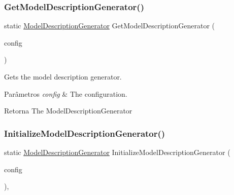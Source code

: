 \subsubsection{\texorpdfstring{Get\+Model\+Description\+Generator()}{GetModelDescriptionGenerator()}}
{\footnotesize\ttfamily static \hyperlink{classApi3Layers_1_1Areas_1_1HelpPage_1_1ModelDescriptions_1_1ModelDescriptionGenerator}{Model\+Description\+Generator} Get\+Model\+Description\+Generator (\begin{DoxyParamCaption}\item[{this Http\+Configuration}]{config }\end{DoxyParamCaption})\hspace{0.3cm}{\ttfamily [static]}}



Gets the model description generator. 


\begin{DoxyParams}{Parâmetros}
{\em config} & The configuration.\\
\hline
\end{DoxyParams}
\begin{DoxyReturn}{Retorna}
The Model\+Description\+Generator
\end{DoxyReturn}
\mbox{\label{classApi3Layers_1_1Areas_1_1HelpPage_1_1HelpPageConfigurationExtensions_a16f47e8aa323c09cd0cf32e89db952bf}} 
\subsubsection{\texorpdfstring{Initialize\+Model\+Description\+Generator()}{InitializeModelDescriptionGenerator()}}
{\footnotesize\ttfamily static \hyperlink{classApi3Layers_1_1Areas_1_1HelpPage_1_1ModelDescriptions_1_1ModelDescriptionGenerator}{Model\+Description\+Generator} Initialize\+Model\+Description\+Generator (\begin{DoxyParamCaption}\item[{Http\+Configuration}]{config }\end{DoxyParamCaption})\hspace{0.3cm}{\ttfamily [static]}, {\ttfamily [private]}}

